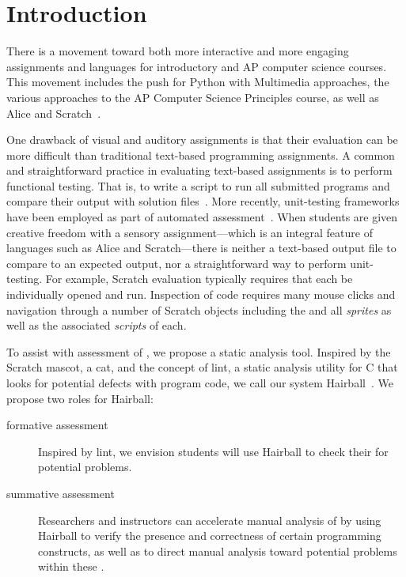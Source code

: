 \section{Introduction}
There is a movement toward both more interactive and more engaging assignments
and languages for introductory and AP computer science courses. This movement
includes the push for Python with Multimedia approaches, the various approaches
to the AP Computer Science Principles course, as well as Alice and
Scratch~\cite{Adams:2012:SLP:2157136.2157319, Forte:2004:CCC:962752.962945,
  Simon:2010:ERC:1822090.1822151, Snyder:2012:FFC:2189835.2189852,
  Cooper:2003:TOI:611892.611966, Maloney:2010:SPL:1868358.1868363}.

One drawback of visual and auditory assignments is that their evaluation can be
more difficult than traditional text-based programming assignments.  A common
and straightforward practice in evaluating text-based assignments is to perform
functional testing. That is, to write a script to run all submitted programs
and compare their output with solution
files~\cite{Jackson:1997:GSP:268084.268210}.  More recently, unit-testing
frameworks have been employed as part of automated
assessment~\cite{Spacco:2006:EMD:1140124.1140131,
  Edwards:2003:RCS:949344.949390}.  When students are given creative freedom
with a sensory assignment---which is an integral feature of languages such as
Alice and Scratch---there is neither a text-based output file to compare to an
expected output, nor a straightforward way to perform unit-testing.  For
example, Scratch evaluation typically requires that each \sprogram{} be
individually opened and run.  Inspection of \sprogram{} code requires many
mouse clicks and navigation through a number of Scratch objects including the
\stage{} and all \emph{sprites} as well as the associated \emph{scripts} of
each.

To assist with assessment of , we propose a static analysis tool.
Inspired by the Scratch mascot, a cat, and the concept of lint, a static
analysis utility for C that looks for potential defects with program code, we
call our system Hairball~\cite{Johnson78lint}. We propose two roles for
Hairball:

\begin{description}
\item[formative assessment] Inspired by lint, we envision students will use
  Hairball to check their  for potential problems.
\item[summative assessment] Researchers and instructors can accelerate manual
  analysis of  by using Hairball to verify the presence and
  correctness of certain programming constructs, as well as to direct manual
  analysis toward potential problems within these .
\end{description}

